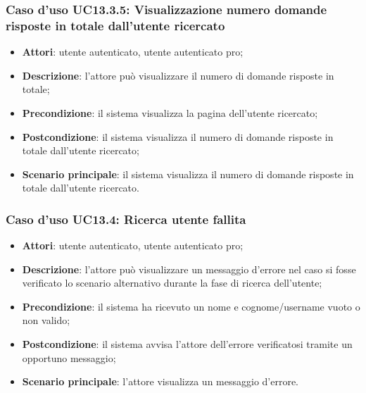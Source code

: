 \subsubsection{Caso d'uso UC13.3.5: Visualizzazione numero domande risposte in totale dall'utente ricercato}
\begin{itemize}
	\item\textbf{Attori}: utente autenticato, utente autenticato pro;
	\item\textbf{Descrizione}: l'attore può visualizzare il numero di domande risposte in totale;
	\item\textbf{Precondizione}: il sistema visualizza la pagina dell'utente ricercato;
	\item\textbf{Postcondizione}: il sistema visualizza il numero di domande risposte in totale dall'utente ricercato;
	\item\textbf{Scenario principale}: il sistema visualizza il numero di domande risposte in totale dall'utente ricercato.
\end{itemize}

\subsubsection{Caso d'uso UC13.4: Ricerca utente fallita}

\begin{itemize}
	\item \textbf{Attori}: utente autenticato, utente autenticato pro;
	\item \textbf{Descrizione}: l'attore può visualizzare un messaggio d'errore nel caso si fosse verificato lo scenario alternativo durante la fase di ricerca dell'utente;
	\item \textbf{Precondizione}: il sistema ha ricevuto un nome e cognome/username vuoto o non valido;
	\item \textbf{Postcondizione}: il sistema avvisa l'attore dell'errore verificatosi tramite un opportuno messaggio;
\item\textbf{Scenario principale}: l'attore visualizza un messaggio d'errore.
\end{itemize}